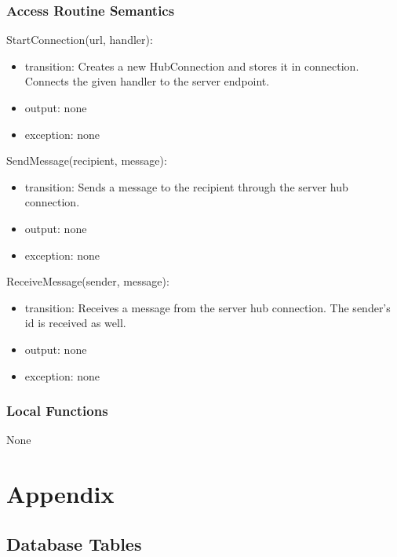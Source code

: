 \documentclass[12pt, titlepage]{article}
\begin{document}
\subsubsection{Access Routine Semantics}

\noindent StartConnection(url, handler):
\begin{itemize}
\item transition: Creates a new HubConnection and stores it in connection. Connects the given handler to the server endpoint.
\item output: none
\item exception: none
\end{itemize}

\noindent SendMessage(recipient, message):
\begin{itemize}
\item transition: Sends a message to the recipient through the server hub connection.
\item output: none
\item exception: none
\end{itemize}

\noindent ReceiveMessage(sender, message):
\begin{itemize}
\item transition: Receives a message from the server hub connection. The sender's id is received as well.
\item output: none
\item exception: none
\end{itemize}

\subsubsection{Local Functions}

None

\newpage

\section{Appendix} \label{Appendix}
\subsection{Database Tables}
\end{document}
